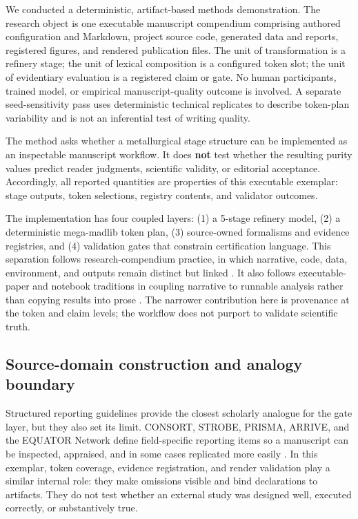 \documentclass[
  english,
]{article}
\begin{document}
We conducted a deterministic, artifact-based methods demonstration. The
research object is one executable manuscript compendium comprising
authored configuration and Markdown, project source code, generated data
and reports, registered figures, and rendered publication files. The
unit of transformation is a refinery stage; the unit of lexical
composition is a configured token slot; the unit of evidentiary
evaluation is a registered claim or gate. No human participants, trained
model, or empirical manuscript-quality outcome is involved. A separate
seed-sensitivity pass uses deterministic technical replicates to
describe token-plan variability and is not an inferential test of
writing quality.

The method asks whether a metallurgical stage structure can be
implemented as an inspectable manuscript workflow. It does \textbf{not}
test whether the resulting purity values predict reader judgments,
scientific validity, or editorial acceptance. Accordingly, all reported
quantities are properties of this executable exemplar: stage outputs,
token selections, registry contents, and validator outcomes.

The implementation has four coupled layers: (1) a 5-stage refinery
model, (2) a deterministic mega-madlib token plan, (3) source-owned
formalisms and evidence registries, and (4) validation gates that
constrain certification language. This separation follows
research-compendium practice, in which narrative, code, data,
environment, and outputs remain distinct but linked
\citep{marwick2018packaging}. It also follows executable-paper and
notebook traditions in coupling narrative to runnable analysis rather
than copying results into prose
\citep{leisch2002sweave, rule2019jupyter}. The narrower contribution
here is provenance at the token and claim levels; the workflow does not
purport to validate scientific truth.

\subsection{Source-domain construction and analogy
boundary}\label{source-domain-construction-and-analogy-boundary}

Structured reporting guidelines provide the closest scholarly analogue
for the gate layer, but they also set its limit. CONSORT, STROBE,
PRISMA, ARRIVE, and the EQUATOR Network define field-specific reporting
items so a manuscript can be inspected, appraised, and in some cases
replicated more easily
\citep{schulz2010consort, vonelm2007strobe, page2021prisma, percie_du_sert2020arrive, equator_network_reporting_guidelines}.
In this exemplar, token coverage, evidence registration, and render
validation play a similar internal role: they make omissions visible and
bind declarations to artifacts. They do not test whether an external
study was designed well, executed correctly, or substantively true.
\end{document}
